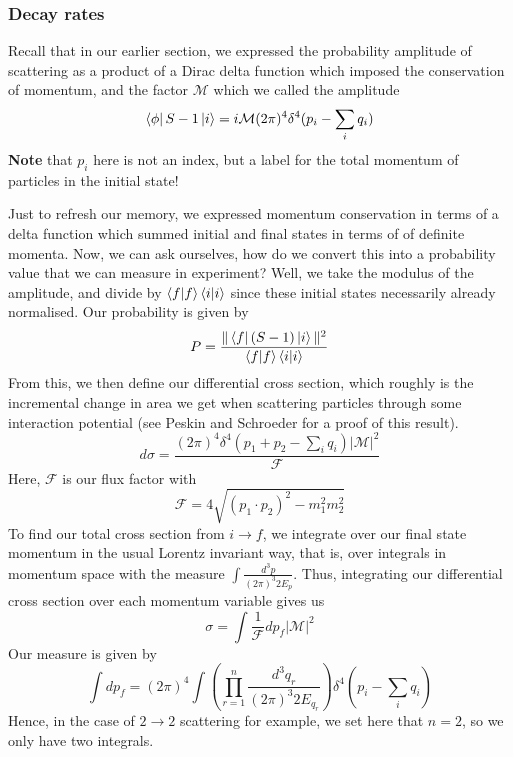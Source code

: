 \subsubsection{Decay rates} 
Recall that in our earlier section, 
we expressed the probability amplitude of scattering 
as a product of a Dirac delta function which imposed 
the conservation of momentum, and the factor 
$ \mathcal{ M } $ which we called the amplitude
\[
	\bra{ \phi } S- 1 \ket{ i } = i \mathcal{ M } ( 2 \pi ) ^ 4 
	\delta ^ 4 ( p_ i - \sum_i q_i ) 
\] \textbf{Note} that $ p_i $ here is not an 
index, but a label for the total momentum 
of particles in the initial state!

Just to refresh our memory, we 
expressed momentum conservation in terms of 
a delta function which summed initial and final states in 
terms of of definite momenta. Now, we can 
ask ourselves, how do we convert this into a probability 
value that we can measure in experiment? 
Well, we take the modulus of the amplitude, 
and divide by $ \bra{f}\ket{f} \bra{i}\ket{i } $ since
these initial states necessarily already normalised. 
Our probability is given by 
\[
	P = \frac{ \| \bra { f} ( S -  1 ) \ket { i } \| ^ 2 }{
	\bra { f}\ket { f} \bra{ i }\ket{ i } }
\]
From this, we then define our differential cross section, 
which roughly is the incremental change in area we 
get when scattering particles through some interaction 
potential (see Peskin and Schroeder for a proof of 
this result). 
\[
	d \sigma = \frac{ ( 2 \pi ) ^ 4 \delta ^ 4 \left( p_1 + p_2 - \sum_ i q _ i \right) | \mathcal{M } | ^ 2 }{
	\mathcal{ F }}
\] Here, $ \mathcal{ F } $ is our flux factor with 
\[
	\mathcal{ F } = 4 \sqrt{ ( p_1 \cdot  p_2 ) ^ 2 - m_1^ 2 m_2 ^ 2} 
\] To find our total cross section from $ i \to f $, 
we integrate over our final state momentum in the usual 
Lorentz invariant way, that is, over 
integrals in momentum space with the measure $ \int \frac{d ^ 3 p }{ ( 2 \pi ) ^ 3  2 E_{ p}}$. 
Thus, integrating our differential cross 
section over each momentum variable gives us 
 \[
 \sigma = \int \frac{1}{ \mathcal{ F } } d p_{ f } | \mathcal{ M } | ^ 2 
\] Our measure is given by 
\[
	\int d p _{ f } = ( 2 \pi ) ^ 4 \int \left( 
	\prod_{ r = 1 } ^ n \frac{ d^ 3 q_r }{ ( 2 \pi ) ^ 3 2 E_{ q _r } }\right) 
	\delta ^ 4 \left( p _ i - \sum_ i q_i \right) 
\]
Hence, in the case of $ 2 \to 2 $  scattering for example, 
we set here that $ n = 2 $, so we only have two integrals. 
